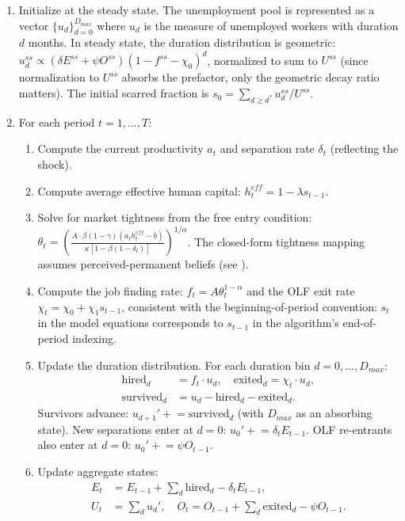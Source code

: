 \documentclass[12pt]{article}
\begin{document}
\begin{enumerate}
\item Initialize at the steady state. The unemployment pool is represented as a vector $\{u_d\}_{d=0}^{D_{max}}$ where $u_d$ is the measure of unemployed workers with duration $d$ months. In steady state, the duration distribution is geometric: $u_d^{ss} \propto (\delta E^{ss} + \psi O^{ss}) (1 - f^{ss} - \chi_0)^d$, normalized to sum to $U^{ss}$ (since normalization to $U^{ss}$ absorbs the prefactor, only the geometric decay ratio matters). The initial scarred fraction is $s_0 = \sum_{d \geq d^*} u_d^{ss} / U^{ss}$.

\item For each period $t = 1, \ldots, T$:
\begin{enumerate}
\item Compute the current productivity $a_t$ and separation rate $\delta_t$ (reflecting the shock).
\item Compute average effective human capital: $h_t^{eff} = 1 - \lambda s_{t-1}$.
\item Solve for market tightness from the free entry condition: $\theta_t = \left(\frac{A \cdot \beta(1 - \gamma)(a_t h_t^{eff} - b)}{\kappa [1 - \beta(1 - \delta_t)]}\right)^{1/\alpha}$. The closed-form tightness mapping assumes perceived-permanent beliefs (see ).
\item Compute the job finding rate: $f_t = A \theta_t^{1-\alpha}$ and the OLF exit rate $\chi_t = \chi_0 + \chi_1 s_{t-1}$, consistent with the beginning-of-period convention: $s_t$ in the model equations corresponds to $s_{t-1}$ in the algorithm's end-of-period indexing.
\item Update the duration distribution. For each duration bin $d = 0, \ldots, D_{max}$:
\begin{align*}
\text{hired}_d &= f_t \cdot u_d, \quad \text{exited}_d = \chi_t \cdot u_d, \\
\text{survived}_d &= u_d - \text{hired}_d - \text{exited}_d.
\end{align*}
Survivors advance: $u_{d+1}' \mathrel{+}= \text{survived}_d$ (with $D_{max}$ as an absorbing state). New separations enter at $d = 0$: $u_0' \mathrel{+}= \delta_t E_{t-1}$. OLF re-entrants also enter at $d = 0$: $u_0' \mathrel{+}= \psi O_{t-1}$.
\item Update aggregate states:
\begin{align*}
E_t &= E_{t-1} + \sum_d \text{hired}_d - \delta_t E_{t-1}, \\
U_t &= \sum_d u_d', \quad O_t = O_{t-1} + \sum_d \text{exited}_d - \psi O_{t-1}.

\end{align*}
\end{enumerate}
\end{enumerate}
\end{document}

